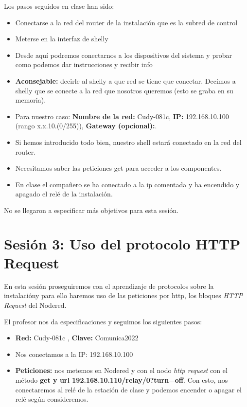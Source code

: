 \documentclass[12pt, a4paper]{article}
\begin{document}
Los pasos seguidos en clase han sido:
\begin{itemize}
    \item Conectarse a la red del router de la instalación que es la subred de control
    \item Meterse en la  interfaz de shelly
    \item Desde aquí podremos conectarnos a los dispositivos del sistema y probar como podemos dar instrucciones y recibir info
    \item \textbf{Aconsejable:} decirle al shelly a que red se tiene que conectar. Decimos a shelly que se conecte a la red que nosotros queremos
    (esto se graba en su memoria).
    \item Para nuestro caso: \textbf{Nombre de la red:} Cudy-081c, \textbf{IP:} 192.168.10.100 (rango x.x.10.(0/255)), 
    \textbf{Gateway (opcional):}. 
    \item Si hemos introducido todo bien, nuestro shell estará conectado en la red del router.
    \item Necesitamos saber las peticiones get para acceder a los componentes.
    \item En clase el compañero se ha conectado a la ip comentada y ha encendido y apagado el relé de la instalación.
    

\end{itemize}

No se llegaron a especificar más objetivos para esta sesión.

\section{Sesión 3: Uso del protocolo HTTP Request}

En esta sesión proseguiremos con el aprendizaje de protocolos sobre la instalacióny para ello haremos uso de las peticiones
por http, los bloques \textit{HTTP Request} del Nodered.

El profesor nos da especificaciones y seguimos los siguientes pasos: 
\begin{itemize}
    \item \textbf{Red:} Cudy-081c ,  \textbf{Clave:} Comunica2022
    \item Nos conectamos a la IP: 192.168.10.100
    \item \textbf{Peticiones:} nos metemos en Nodered y con el 
    nodo \textit{http request} con el método \textbf{get y url 192.168.10.110/relay/0?turn=off}. Con esto, nos conectaremos al relé de 
    la estación de clase y podemos encender o apagar el relé según consideremos. 
 
\end{itemize}
\end{document}

